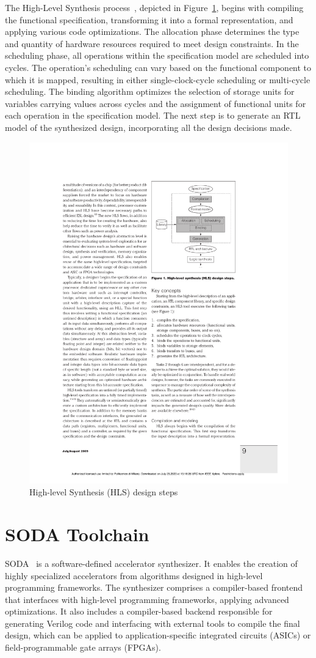 The High-Level Synthesis process~\cite{5209958}, depicted in Figure~\ref{fig:hls}, begins with compiling the functional specification, transforming it into a formal representation, and applying various code optimizations.
The allocation phase determines the type and quantity of hardware resources required to meet design constraints.
In the scheduling phase, all operations within the specification model are scheduled into cycles.
The operation's scheduling can vary based on the functional component to which it is mapped, resulting in either single-clock-cycle scheduling or multi-cycle scheduling.
The binding algorithm optimizes the selection of storage units for variables carrying values across cycles and the assignment of functional units for each operation in the specification model.
The next step is to generate an RTL model of the synthesized design, incorporating all the design decisions made.

\begin{figure}[t]
    \centering
    \includegraphics[height=0.4\textwidth]{Images/hls}
    \caption{High-level Synthesis (HLS) design steps~\cite{5209958}}
    \label{fig:hls}
\end{figure}

\section{SODA Toolchain}
\label{sec:soda}%

SODA~\cite{9786533} is a software-defined accelerator synthesizer.
It enables the creation of highly specialized accelerators from algorithms designed in high-level programming frameworks.
The synthesizer comprises a compiler-based frontend that interfaces with high-level programming frameworks, applying advanced optimizations.
It also includes a compiler-based backend responsible for generating Verilog code and interfacing with external tools to compile the final design, which can be applied to application-specific integrated circuits (ASICs) or field-programmable gate arrays (FPGAs).

